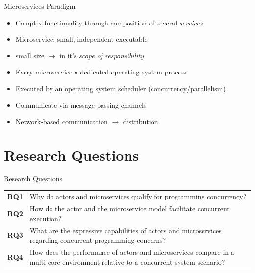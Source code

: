 \documentclass{beamer}
\begin{document}

\begin{frame}{Microservices Paradigm}

\begin{itemize}
  \item Complex functionality through composition of several \textit{services}
  \item Microservice: small, independent executable
  \item \glqq small\grqq{} size $\rightarrow$ in it's \textit{scope of responsibility}
  \item Every microservice a dedicated operating system process
  \item Executed by an operating system scheduler (concurrency/parallelism)
  \item Communicate via message passing channels
  \item Network-based communication $\rightarrow$ distribution
\end{itemize}

\end{frame}


\section{Research Questions}


\begin{frame}{Research Questions}

\begin{table}
  \begin{tabularx}{\textwidth}{lX}                                                                                                                    \\[10pt]%
    \textbf{RQ1} & Why do actors and microservices qualify for programming concurrency?                                                               \\[10pt]%
    \textbf{RQ2} & How do the actor and the microservice model facilitate concurrent execution?                                                       \\[10pt]%
    \textbf{RQ3} & What are the expressive capabilities of actors and microservices regarding concurrent programming concerns?                        \\[10pt]%
    \textbf{RQ4} & How does the performance of actors and microservices compare in a multi-core environment relative to a concurrent system scenario?
  \end{tabularx}
\end{table}

\end{frame}
\end{document}
